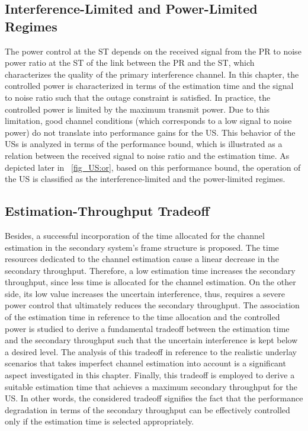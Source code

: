 \subsection{Interference-Limited and Power-Limited Regimes}
The power control at the ST depends on the received signal from the PR to noise power ratio at the ST of the link between the PR and the ST, which characterizes the quality of the primary interference channel. In this chapter, the controlled power is characterized in terms of the estimation time and the signal to noise ratio such that the outage constraint is satisfied. In practice, the controlled power is limited by the maximum transmit power. Due to this limitation, good channel conditions (which corresponds to a low signal to noise power) do not translate into performance gains for the US. This behavior of the USs is analyzed in terms of the performance bound, which is illustrated as a relation between the received signal to noise ratio and the estimation time. As depicted later in \figurename~\ref{fig_US:or}, based on this performance bound, the operation of the US is classified as the interference-limited and the power-limited regimes.

\subsection{Estimation-Throughput Tradeoff}
Besides, a successful incorporation of the time allocated for the channel estimation in the secondary system's frame structure is proposed. The time resources dedicated to the channel estimation cause a linear decrease in the secondary throughput. Therefore, a low estimation time increases the secondary throughput, since less time is allocated for the channel estimation. On the other side, its low value increases the uncertain interference, thus, requires a severe power control that ultimately reduces the secondary throughput. The association of the estimation time in reference to the time allocation and the controlled power is studied to derive a fundamental tradeoff between the estimation time and the secondary throughput such that the uncertain interference is kept below a desired level. The analysis of this tradeoff in reference to the realistic underlay scenarios that takes imperfect channel estimation into account is a significant aspect investigated in this chapter. Finally, this tradeoff is employed to derive a suitable estimation time that achieves a maximum secondary throughput for the US. In other words, the considered tradeoff signifies the fact that the performance degradation in terms of the secondary throughput can be effectively controlled only if the estimation time is selected appropriately.

